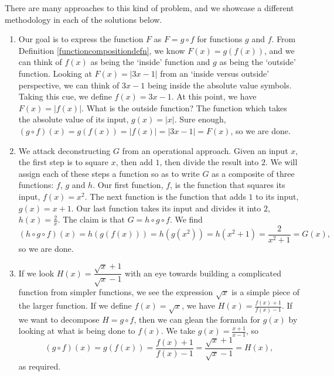 {
There are many approaches to this kind of problem, and we showcase a different methodology in each of the solutions below.

\begin{enumerate}

\item  Our goal is to express the function $F$ as $F = g \circ f$ for functions $g$ and $f$.  From Definition \ref{functioncompositiondefn}, we know $F(x) = g(f(x))$, and we can think of $f(x)$ as being the `inside' function and $g$ as being the `outside' function.  Looking at $F(x) = |3x-1|$ from an `inside versus outside' perspective, we can think of $3x-1$ being inside the absolute value symbols.  Taking this cue, we define $f(x) = 3x-1$.  At this point, we have $F(x) = |f(x)|$.  What is the outside function?  The function which takes the absolute value of its input, $g(x) = |x|$. Sure enough,  $(g \circ f)(x) = g(f(x)) = |f(x)| = |3x-1| = F(x)$, so we are done.

\item  We attack deconstructing $G$ from an operational approach.  Given an input $x$, the first step is to square $x$, then add $1$, then divide the result into $2$.  We will assign each of these steps a function so as to write $G$ as a composite of three functions: $f$, $g$ and $h$.  Our first function, $f$, is the function that squares its input, $f(x) = x^2$.  The next function is the function that adds $1$ to its input, $g(x) = x+1$.  Our last function takes its input and divides it into $2$, $h(x) = \frac{2}{x}$.  The claim is that $G = h \circ g \circ f$. We find  \[(h \circ g \circ f)(x) = h(g(f(x))) = h(g\left(x^2\right)) = h\left(x^2+1\right)= \frac{2}{x^2+1} = G(x),\] so we are done.
\item  If we look $H(x) = \dfrac{\sqrt{x}+1}{\sqrt{x}-1}$ with an eye towards building a complicated function from simpler functions, we see the expression $\sqrt{x}$ is a simple piece of the larger function.  If we define $f(x) = \sqrt{x}$, we have $H(x) = \frac{f(x)+1}{f(x)-1}$.  If we want to decompose $H = g \circ f$, then we can glean the formula for $g(x)$ by looking at what is being done to $f(x)$.  We take $g(x) = \frac{x+1}{x-1}$, so \[(g \circ f)(x) = g(f(x)) = \frac{f(x)+1}{f(x)-1} = \frac{\sqrt{x}+1}{\sqrt{x}-1} = H(x),\] as required.  

\end{enumerate}
}


